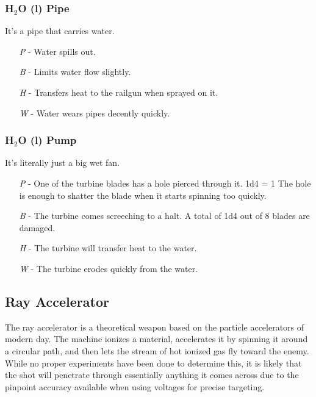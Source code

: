 \documentclass[a4paper]{article}
\begin{document}
\vspace{-0.5cm} \hspace{-18pt} \subsubsection{H$_2$O (l) Pipe} \label{railgun_h2o_pipe} \vspace{-0.2cm}
It's a pipe that carries water.
\begin{enumerate}
\item [\textit{P}] - Water spills out.
\item [\textit{B}] - Limits water flow slightly.
\item [\textit{H}] - Transfers heat to the railgun when sprayed on it.
\item [\textit{W}] - Water wears pipes decently quickly.
\end{enumerate}

\vspace{-0.5cm} \hspace{-18pt} \subsubsection{H$_2$O (l) Pump} \label{railgun_h2o_l_pump} \vspace{-0.2cm}
It's literally just a big wet fan.
\begin{enumerate}
\item [\textit{P}] - One of the turbine blades has a hole pierced through it. \newline \hspace*{3pt} 1d4 = 1 The hole is enough to shatter the blade when it starts spinning too quickly. 
\item [\textit{B}] - The turbine comes screeching to a halt. A total of 1d4 out of 8 blades are damaged.
\item [\textit{H}] - The turbine will transfer heat to the water. 
\item [\textit{W}] - The turbine erodes quickly from the water.
\end{enumerate}

\subsection{Ray Accelerator} \label{ray}

The ray accelerator is a theoretical weapon based on the particle accelerators of modern day. The machine ionizes a material, accelerates it by spinning it around a circular path, and then lets the stream of hot ionized gas fly toward the enemy. While no proper experiments have been done to determine this, it is likely that the shot will penetrate through essentially anything it comes across due to the pinpoint accuracy available when using voltages for precise targeting.
\end{document}
